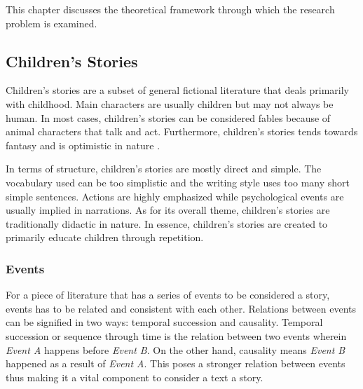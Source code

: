 %
%
%                 

\label{sec:theoreticalframework}

This chapter discusses the theoretical framework through which the research problem is examined.

\subsection{Children's Stories}
\label{sec:childrenstories}

Children's stories are a subset of general fictional literature that deals primarily with childhood. Main characters are usually children but may not always be human. In most cases, children's stories can be considered fables because of animal characters that talk and act. Furthermore, children's stories tends towards fantasy and is optimistic in nature \cite{Nodelman:2008}.

In terms of structure, children's stories are mostly direct and simple. The vocabulary used can be too simplistic and the writing style uses too many short simple sentences. Actions are highly emphasized while psychological events are usually implied in narrations. As for its overall theme, children's stories are traditionally didactic in nature. In essence, children's stories are created to primarily educate children through repetition. 

\subsubsection{Events}
\label{sec:events}

For a piece of literature that has a series of events to be considered a story, events has to be related and consistent with each other. Relations between events can be signified in two ways: temporal succession and causality. Temporal succession or sequence through time is the relation between two events wherein \textit{Event A} happens before \textit{Event B}. On the other hand, causality means \textit{Event B} happened as a result of \textit{Event A}. This poses a stronger relation between events thus making it a vital component to consider a text a story. 

